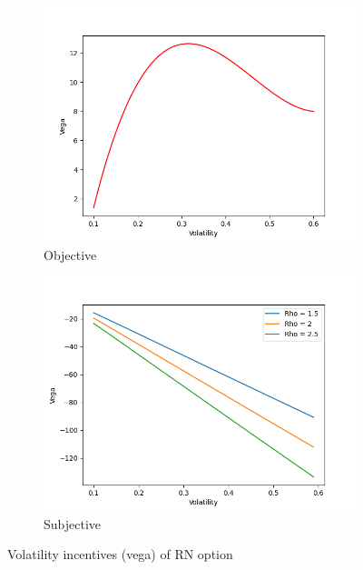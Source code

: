 \vspace*{15pt}
\begin{figure}[H]
    \centering
    \begin{subfigure}{0.45\textwidth}
        \centering
        \includegraphics[width=\textwidth]{fig/4/vega_obj.png}
        \caption{Objective}
        \label{fig:rn_vega_obj}
    \end{subfigure}
    \hfill
    \begin{subfigure}{0.45\textwidth}
        \centering
        \includegraphics[width=\textwidth]{fig/4/vega_subj.png}
        \caption{Subjective}
        \label{fig:rn_vega_subj}
    \end{subfigure}
    \caption{Volatility incentives (vega) of RN option}
    \label{fig:rn_vega_both}
\end{figure}
\vspace*{15pt}


